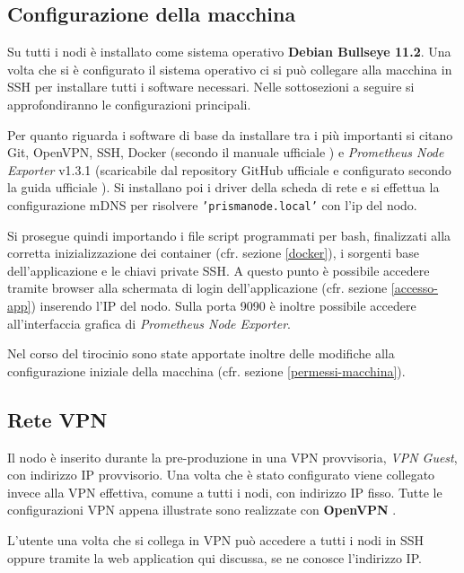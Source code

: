 \subsection{Configurazione della macchina} \label{debian}

Su tutti i nodi è installato come sistema operativo \textbf{Debian Bullseye 11.2}.
Una volta che si è configurato il sistema operativo ci si può collegare alla macchina in SSH per installare tutti i software necessari. Nelle sottosezioni a seguire si approfondiranno le configurazioni principali.

Per quanto riguarda i software di base da installare tra i più importanti si citano Git, OpenVPN, SSH, Docker (secondo il manuale ufficiale \cite{install-Docker-Debian}) e \emph{Prometheus Node Exporter} v1.3.1 (scaricabile dal repository GitHub ufficiale \cite{Prometheus-node-exporter-github} e configurato secondo la guida ufficiale \cite{Prometheus-node-exporter}). Si installano poi i driver della scheda di rete e si effettua la configurazione mDNS per risolvere \texttt{'prismanode.local'} con l'ip del nodo.

Si prosegue quindi importando i file script programmati per bash, finalizzati alla corretta inizializzazione dei container (cfr. sezione \ref{docker}), i sorgenti base dell'applicazione e le chiavi private SSH. A questo punto è possibile accedere tramite browser alla schermata di login dell'applicazione (cfr. sezione \ref{accesso-app}) inserendo l'IP del nodo. Sulla porta 9090 è inoltre possibile accedere all'interfaccia grafica di \emph{Prometheus Node Exporter}. 

Nel corso del tirocinio sono state apportate inoltre delle modifiche alla configurazione iniziale della macchina (cfr. sezione \ref{permessi-macchina}).

\subsection{Rete VPN} \label{rete-VPN}

Il nodo è inserito durante la pre-produzione in una VPN provvisoria, \emph{VPN Guest}, con indirizzo IP provvisorio. Una volta che è stato configurato viene collegato invece alla VPN effettiva, comune a tutti i nodi, con indirizzo IP fisso.
Tutte le configurazioni VPN appena illustrate sono realizzate con \textbf{OpenVPN} \cite{OpenVPN}.

L'utente una volta che si collega in VPN può accedere a tutti i nodi in SSH oppure tramite la web application qui discussa, se ne conosce l'indirizzo IP.

